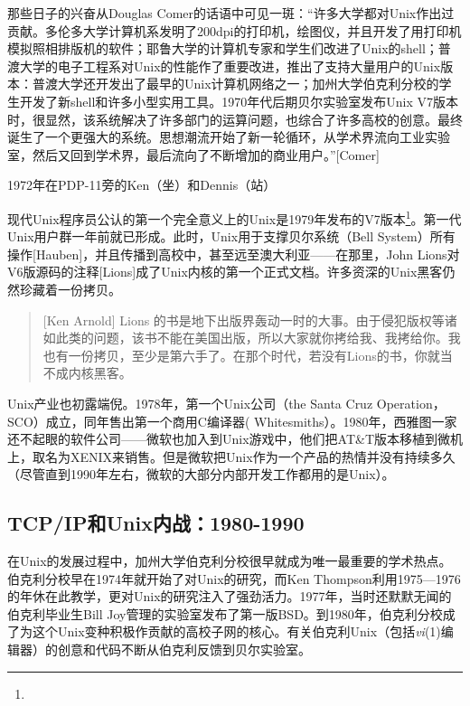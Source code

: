\documentclass[12pt,oneside]{book}
\begin{document}
\begin{common-format}
那些日子的兴奋从Douglas Comer的话语中可见一斑：“许多大学都对Unix作出过贡献。多伦多大学计算机系发明了200dpi的打印机，绘图仪，并且开发了用打印机模拟照相排版机的软件；耶鲁大学的计算机专家和学生们改进了Unix的shell；普渡大学的电子工程系对Unix的性能作了重要改进，推出了支持大量用户的Unix版本：普渡大学还开发出了最早的Unix计算机网络之一；加州大学伯克利分校的学生开发了新shell和许多小型实用工具。1970年代后期贝尔实验室发布Unix V7版本时，很显然，该系统解决了许多部门的运算问题，也综合了许多高校的创意。最终诞生了一个更强大的系统。思想潮流开始了新一轮循环，从学术界流向工业实验室，然后又回到学术界，最后流向了不断增加的商业用户。”[Comer]
\begin{fig}[7]{1972年在PDP-11旁的Ken（坐）和Dennis（站）}
\label{fig:1972年在PDP-11旁的Ken（坐）和Dennis（站）}
\end{fig}

现代Unix程序员公认的第一个完全意义上的Unix是1979年发布的V7版本\footnote{}。第一代Unix用户群一年前就已形成。此时，Unix用于支撑贝尔系统（Bell System）所有操作[Hauben]，并且传播到高校中，甚至远至澳大利亚——在那里，John Lions对V6版源码的注释[Lions]成了Unix内核的第一个正式文档。许多资深的Unix黑客仍然珍藏着一份拷贝。

\begin{quote}[Ken Arnold]
Lions 的书是地下出版界轰动一时的大事。由于侵犯版权等诸如此类的问题，该书不能在美国出版，所以大家就你拷给我、我拷给你。我也有一份拷贝，至少是第六手了。在那个时代，若没有Lions的书，你就当不成内核黑客。
\end{quote}

Unix产业也初露端倪。1978年，第一个Unix公司（the Santa Cruz Operation，SCO）成立，同年售出第一个商用C编译器( Whitesmiths）。1980年，西雅图一家还不起眼的软件公司——微软也加入到Unix游戏中，他们把AT\&{}T版本移植到微机上，取名为XENIX来销售。但是微软把Unix作为一个产品的热情并没有持续多久（尽管直到1990年左右，微软的大部分内部开发工作都用的是Unix）。

\subsection{TCP/IP和Unix内战：1980-1990}
在Unix的发展过程中，加州大学伯克利分校很早就成为唯一最重要的学术热点。伯克利分校早在1974年就开始了对Unix的研究，而Ken Thompson利用1975—1976的年休在此教学，更对Unix的研究注入了强劲活力。1977年，当时还默默无闻的伯克利毕业生Bill Joy管理的实验室发布了第一版BSD。到1980年，伯克利分校成了为这个Unix变种积极作贡献的高校子网的核心。有关伯克利Unix（包括\textit{vi}(1)编辑器）的创意和代码不断从伯克利反馈到贝尔实验室。


\end{common-format}
\end{document}
